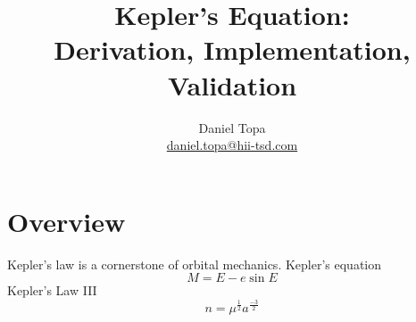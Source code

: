 \documentclass[10pt, oneside]{article}   	%
\title{Kepler's Equation: \\Derivation, Implementation, Validation}
\author{Daniel Topa\\\href{mailto:daniel.topa@hii-tsd.com}{daniel.topa@hii-tsd.com}}
\affil{\href{https://hii.com/what-we-do/divisions/mission-technologies/}{Mission Technologies}
\\Huntington Ingalls Industries
\\Kirtland AFB, NM}
\begin{document}
\maketitle
{}
\tableofcontents

\section{Overview}
Kepler's law is a cornerstone of orbital mechanics.
Kepler's equation
\begin{equation}
	M = E - e \sin E
\label{eq:kepler-law}
\end{equation}
Kepler's Law III
\begin{equation}
	n = \mu^{\tfrac{1}{2}} a^{\tfrac{-3}{2}}
\label{eq:kepler-law-III}
\end{equation}


		
		
		
		\appendix
		
				
		\printbibliography
			
\end{document}
